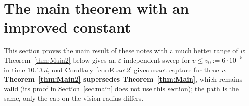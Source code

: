 
\newcommand{\TzW}{W_1}
\newcommand{\TzjW}{j_W}
\newcommand{\TztW}{t_W}
\newcommand{\TzLJ}{L_J}
\providecommand{\ESf}{f_{\mathrm F}}\providecommand{\ESd}{d_{\mathrm L}}\providecommand{\ESq}{q_{\mathrm c}}
\providecommand{\ESchi}{\chi_{\mathrm g}}\providecommand{\ESX}{X_{\mathrm{far}}}\providecommand{\EScamp}{c_{\mathrm{amp}}}
\providecommand{\ESCone}{C_{1\mathrm A}}\providecommand{\ESDI}{D_{\mathrm I}}\providecommand{\ESDs}{D_{\mathrm{IIs}}}
\providecommand{\ESDl}{D_{\mathrm{IIl}}}
\newcommand{\TzDb}{\bar D}
\newcommand{\Tzgd}{\gamma_{\mathrm D}}
\newcommand{\TzetD}{\eta_{\mathrm D}}
\newcommand{\TzetN}{\eta_{\mathrm N}}
\newcommand{\TzFb}{\BF_{\mathrm b}}
\newcommand{\TzHT}{\textup{(H$_{\mathrm T}'$)}}
\newcommand{\TzUmin}{U_{\min}}
\newcommand{\Tzkt}{\kappa_2}

\section{The main theorem with an improved constant}\label{sec:main2}

This section proves the main result of these notes with a much better range of $v$: Theorem~\ref{thm:Main2} below gives an
$\varepsilon$-independent sweep for $v\le v_0:=6\cdot10^{-5}$ in time $10.13\,d$, and Corollary~\ref{cor:Exact2} gives exact
capture for these $v$. \textbf{Theorem~\ref{thm:Main2} supersedes Theorem~\ref{thm:Main}}, which remains valid (its proof in
Section~\ref{sec:main} does not use this section); the path is the same, only the cap on the vision radius differs.

